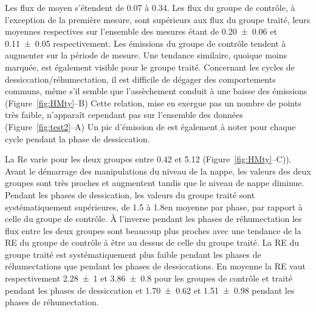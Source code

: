 Les flux de \chh moyen s'étendent de \num{0.07} à \SI{0.34}{\uml}.
Les flux du groupe de contrôle, à l'exception de la première mesure, sont supérieurs aux flux du groupe traité, leurs moyennes respectives sur l'ensemble des mesures étant de \num{0.20(006)} et \SI{0.11(005)}{\uml} respectivement.
Les émissions du groupe de contrôle tendent à augmenter sur la période de mesure.
Une tendance similaire, quoique moins marquée, est également visible pour le groupe traité.
Concernant les cycles de dessiccation/réhumectation, il est difficile de dégager des comportements communs, même s'il semble que l'assèchement conduit à une baisse des émissions (Figure~\ref{fig:HMty}--B)
Cette relation, mise en exergue pas un nombre de points très faible, n’apparaît cependant pas sur l'ensemble des données (Figure~\ref{fig:test2}--A)
Un pic d'émission de \chh est également à noter pour chaque cycle pendant la phase de dessiccation.

La Re varie pour les deux groupes entre \num{0.42} et \SI{5.12}{\uml} (Figure~\ref{fig:HMty}--C)).
Avant le démarrage des manipulations du niveau de la nappe, les valeurs des deux groupes sont très proches et augmentent tandis que le niveau de nappe diminue.
Pendant les phases de dessication, les valeurs du groupe traité sont systématiquement supérieures, de \num{1.5} à \SI{1.8}{\uml}en moyenne par phase, par rapport à celle du groupe de contrôle.
À l'inverse pendant les phases de réhumectation les flux entre les deux groupes sont beaucoup plus proches avec une tendance de la RE du groupe de contrôle à être au dessus de celle du groupe traité.
La RE du groupe traité est systématiquement plus faible pendant les phases de réhumectations que pendant les phases de dessiccations.
En moyenne la RE vaut respectivement \num{2.28(100)} et \SI{3.86(080)}{\uml} pour les groupes de contrôle et traité pendant les phases de dessiccation et \num{1.70(062)} et \SI{1.51(098)}{\uml} pendant les phases de réhumectation.

